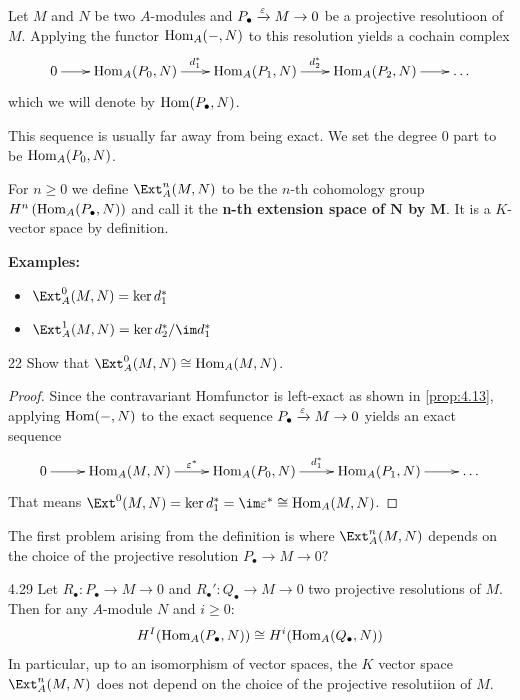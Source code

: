 \documentclass[twoside = false,	%
		headsepline,		%
		parskip = true,
		]{scrbook}						%
\begin{document}
    Let $M$ and $N$ be two $A$-modules and $P_\bullet \xrightarrow{\varepsilon} M \to 0$ be a projective resolutioon of $M$. Applying the functor $\mathrm{Hom}_A(-,N)$ to this resolution yields a cochain complex
    \begin{equation*}
    \xymatrix@C=20pt {
        0 \ar[r] & \Hom_A(P_0,N) \ar[r]^{d_1^*} & \Hom_A(P_1,N) \ar[r]^{d_2^*} & \Hom_A(P_2,N) \ar[r] & \dots
    }
    \end{equation*}
    which we will denote by $\mathrm{Hom}(P_\bullet,N)$.

    This sequence is usually far away from being exact. We set the degree $0$ part to be $\mathrm{Hom}_A(P_0,N)$.

    \begin{definition}{}{}
        For $n \geq 0$ we define $\Ext^n_A(M,N)$ to be the $n$-th cohomology group $H^n\left( \mathrm{Hom}_A(P_\bullet,N)\right)$ and call it the \textbf{n-th extension space of $\mathbf{N}$ by $\mathbf{M}$}. It is a $K$-vector space by definition.
    \end{definition}

    \textbf{Examples:}
    \begin{itemize}
        \item $\Ext^0_A(M,N) = \ker d_1^*$
        \item $\Ext^1_A(M,N) = \ker d_2^*/\im d_1^*$
    \end{itemize}

    \begin{exercise}{}{22}
        Show that $\Ext_A^0(M,N) \cong \Hom_A(M,N)$.
    \end{exercise}

    \begin{proof}
        Since the contravariant Homfunctor is left-exact as shown in \ref{prop:4.13}, applying $\mathrm{Hom}(-,N)$ to the exact sequence $P_\bullet \xrightarrow{\varepsilon} M \to 0$ yields an exact sequence
        \begin{equation*}
        \xymatrix {
            0 \ar[r] & \Hom_A(M,N) \ar[r]^{\e^*} & \Hom_A(P_0,N) \ar[r]^{d_1^*} & \Hom_A(P_1,N) \ar[r] & \dots
        }
        \end{equation*}
        That means $\Ext^0(M,N) = \ker d_1^* = \im \e^* \cong \Hom_A(M,N)$.
    \end{proof}

    The first problem arising from the definition is where $\Ext_A^n(M,N)$ depends on the choice of the projective resolution $P_\bullet \to M \to 0?$

    \begin{theorem}{}{4.29}
        Let $R_\bullet: P_\bullet \to M \to 0$ and $R_\bullet': Q_\bullet \to M \to 0$ two projective resolutions of $M$. Then for any $A$-module $N$ and $i \geq 0$:
        \begin{equation*}
            H^I(\mathrm{Hom}_A(P_\bullet,N)) \cong H^i(\mathrm{Hom}_A(Q_\bullet,N))
        \end{equation*}
        In particular, up to an isomorphism of vector spaces, the $K$ vector space $\Ext^n_A(M,N)$ does not depend on the choice of the projective resolutiion of $M$.
    \end{theorem}
\end{document}
